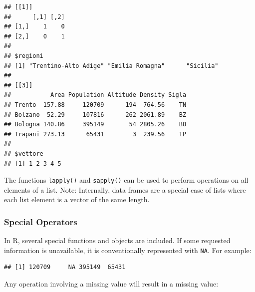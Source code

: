 \documentclass[
]{article}
\newenvironment{Shaded}{\begin{snugshade}}{\end{snugshade}}
\newcommand{\ConstantTok}[1]{\textcolor[rgb]{0.56,0.35,0.01}{#1}}
\newcommand{\DecValTok}[1]{\textcolor[rgb]{0.00,0.00,0.81}{#1}}
\newcommand{\FunctionTok}[1]{\textcolor[rgb]{0.13,0.29,0.53}{\textbf{#1}}}
\newcommand{\NormalTok}[1]{#1}
\newcommand{\OtherTok}[1]{\textcolor[rgb]{0.56,0.35,0.01}{#1}}
\newcommand{\SpecialCharTok}[1]{\textcolor[rgb]{0.81,0.36,0.00}{\textbf{#1}}}
\begin{document}
\begin{verbatim}
## [[1]]
##      [,1] [,2]
## [1,]    1    0
## [2,]    0    1
## 
## $regioni
## [1] "Trentino-Alto Adige" "Emilia Romagna"      "Sicilia"            
## 
## [[3]]
##           Area Population Altitude Density Sigla
## Trento  157.88     120709      194  764.56    TN
## Bolzano  52.29     107816      262 2061.89    BZ
## Bologna 140.86     395149       54 2805.26    BO
## Trapani 273.13      65431        3  239.56    TP
## 
## $vettore
## [1] 1 2 3 4 5
\end{verbatim}

The functions \texttt{lapply()} and \texttt{sapply()} can be used to
perform operations on all elements of a list. Note: Internally, data
frames are a special case of lists where each list element is a vector
of the same length.

\hypertarget{special-operators}{%
\subsubsection{Special Operators}\label{special-operators}}

In R, several special functions and objects are included. If some
requested information is unavailable, it is conventionally represented
with \texttt{NA}. For example:

\begin{Shaded}
\end{Shaded}

\begin{verbatim}
## [1] 120709     NA 395149  65431
\end{verbatim}

Any operation involving a missing value will result in a missing value:

\begin{Shaded}
\end{Shaded}
\end{document}
